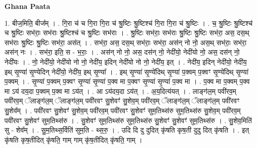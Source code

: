 \documentclass[17pt]{extarticle}
\begin{document}
\textbf{Ghana Paata } \newline

1. बीज॒मिति॒ बीज᳚म् । . गि॒रा च॑ च गि॒रा गि॒रा च॑ श्रु॒ष्टिः श्रु॒ष्टिश्च॑ गि॒रा गि॒रा च॑ श्रु॒ष्टिः । . च॒ श्रु॒ष्टिः श्रु॒ष्टिश्च॑ च श्रु॒ष्टिः सभ॑राः॒ सभ॑राः श्रु॒ष्टिश्च॑ च श्रु॒ष्टिः सभ॑राः । . श्रु॒ष्टिः सभ॑राः॒ सभ॑राः श्रु॒ष्टिः श्रु॒ष्टिः सभ॑रा॒ अस॒ दस॒थ् सभ॑राः श्रु॒ष्टिः श्रु॒ष्टिः सभ॑रा॒ अस॑त् । . सभ॑रा॒ अस॒ दस॒थ् सभ॑राः॒ सभ॑रा॒ अस॑न् नो नो॒ अस॒थ् सभ॑राः॒ सभ॑रा॒ अस॑न् नः । . सभ॑रा॒ इति॒ स - भ॒राः॒ । . अस॑न् नो नो॒ अस॒ दस॑न् नो॒ नेदी॑यो॒ नेदी॑यो नो॒ अस॒ दस॑न् नो॒ नेदी॑यः । . नो॒ नेदी॑यो॒ नेदी॑यो नो नो॒ नेदी॑य॒ इदिन् नेदी॑यो नो नो॒ नेदी॑य॒ इत् । . नेदी॑य॒ इदिन् नेदी॑यो॒ नेदी॑य॒ इथ् सृ॒ण्या॑ सृ॒ण्येदिन् नेदी॑यो॒ नेदी॑य॒ इथ् सृ॒ण्या᳚ । . इथ् सृ॒ण्या॑ सृ॒ण्ये॑दिथ् सृ॒ण्या॑ प॒क्वम् प॒क्वꣳ सृ॒ण्ये॑दिथ् सृ॒ण्या॑ प॒क्वम् । . सृ॒ण्या॑ प॒क्वम् प॒क्वꣳ सृ॒ण्या॑ सृ॒ण्या॑ प॒क्व मा प॒क्वꣳ सृ॒ण्या॑ सृ॒ण्या॑ प॒क्व मा । . प॒क्व मा प॒क्वम् प॒क्व मा ऽय॑ दय॒दा प॒क्वम् प॒क्व मा ऽय॑त् । . आ ऽय॑दय॒दा ऽय॑त् । . अ॒य॒दित्य॑यत् । . लाङ्ग॑ल॒म् पवी॑रव॒म् पवी॑रव॒म् ॅलाङ्ग॑ल॒म् ॅलाङ्ग॑ल॒म् पवी॑रवꣳ सु॒शेवꣳ॑ सु॒शेव॒म् पवी॑रव॒म् ॅलाङ्ग॑ल॒म् ॅलाङ्ग॑ल॒म् पवी॑रवꣳ सु॒शेव᳚म् । . पवी॑रवꣳ सु॒शेवꣳ॑ सु॒शेव॒म् पवी॑रव॒म् पवी॑रवꣳ सु॒शेवꣳ॑ सुम॒तिथ्स॑रु सुम॒तिथ्स॑रु सु॒शेव॒म् पवी॑रव॒म् पवी॑रवꣳ सु॒शेवꣳ॑ सुम॒तिथ्स॑रु । . सु॒शेवꣳ॑ सुम॒तिथ्स॑रु सुम॒तिथ्स॑रु सु॒शेवꣳ॑ सु॒शेवꣳ॑ सुम॒तिथ्स॑रु । . सु॒शेव॒मिति॑ सु - शेव᳚म् । . सु॒म॒तिथ्स॒र्विति॑ सुम॒ति - थ्स॒रु॒ । . उदि दि दु दुदित् कृ॑षति कृष॒ती दुदु दित् कृ॑षति । . इत् कृ॑षति कृष॒तीदित् कृ॑षति॒ गाम् गाम् कृ॑ष॒तीदित् कृ॑षति॒ गाम् । \newline
\end{document}
